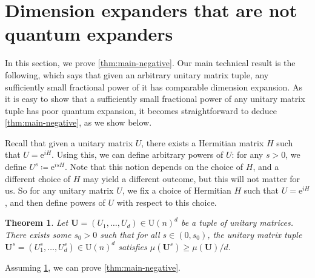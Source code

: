 \documentclass[11pt]{article}
\newtheorem{theorem}{Theorem}[section]
\newcommand{\eee}{\mathrm e}
\theoremstyle{plain}
\numberwithin{equation}{section}
\theoremstyle{definition}
\newcommand{\tuple}[1]{\mathbf{#1}}
\newcommand{\vU}{\tuple{U}}
\begin{document}
%


\section{Dimension expanders that are not quantum expanders}\label{sec:dim-not-quantum}
In this section, we prove \cref{thm:main-negative}. Our main technical result is the following, which says that given an arbitrary unitary matrix tuple, any sufficiently small fractional power of it has comparable dimension expansion. As it is easy to show that a sufficiently small fractional power of any unitary matrix tuple has poor quantum expansion, it becomes straightforward to deduce \cref{thm:main-negative}, as we show below.

Recall that given a unitary matrix $U$, there exists a Hermitian matrix $H$ such that 
$U = \eee^{iH}$. Using this, we can define arbitrary powers of $U$: for any $s>0$, we define $U^s \coloneqq \eee^{isH}$. Note that this notion depends on the choice of $H$, and a different choice of $H$ may yield a different outcome, but this will not matter for us. So for any unitary matrix $U$, we fix a choice of Hermitian $H$ such that $U=\eee^{iH}$, and then define powers of $U$ with respect to this choice.
\begin{theorem}\label{thm:exp-keeps-dim-exp}
    Let $\vU=(U_1,\dots,U_d)\in \mathrm{U}(n)^d$ be a tuple of unitary matrices. There exists some $s_0>0$ such that for all $s \in (0,s_0)$, the unitary matrix tuple $\vU^s=(U_1^s,\dots,U_d^s)\in\mathrm{U}(n)^d$ satisfies $\mu(\vU^s) \geq \mu(\vU)/d$.
\end{theorem}

Assuming \cref{thm:exp-keeps-dim-exp}, we can prove \cref{thm:main-negative}.
\end{document}
